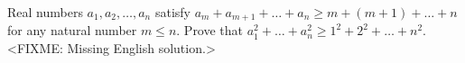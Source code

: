 \problem
Real numbers $a_1, a_2, \ldots, a_n$ satisfy
$a_m + a_{m + 1} + \ldots + a_n \geq m + (m + 1) + \ldots + n$
for any natural number $m \leq n$.
Prove that $a_1^2 + \ldots + a_n^2 \geq 1^2 + 2^2 + \ldots + n^2$.
\solution
<FIXME: Missing English solution.>
\endproblem
